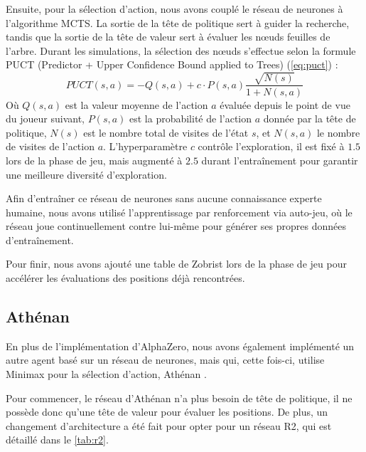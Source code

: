 \documentclass[a4paper,11pt]{article}
\begin{document}
Ensuite, pour la sélection d'action, nous avons couplé le réseau de neurones à l'algorithme MCTS. La sortie de la tête de politique sert à guider la recherche, tandis que la sortie de la tête de valeur sert à évaluer les n\oe uds feuilles de l'arbre. Durant les simulations, la sélection des n\oe uds s'effectue selon la formule PUCT (Predictor + Upper Confidence Bound applied to Trees) (\autoref{eq:puct}) :
\begin{equation}
	PUCT(s, a) = -Q(s, a) + c \cdot P(s, a) \frac{\sqrt{N(s)}}{1 + N(s, a)}
	\label{eq:puct}
\end{equation}
Où $Q(s, a)$ est la valeur moyenne de l'action $a$ évaluée depuis le point de vue du joueur suivant, $P(s, a)$ est la probabilité de l'action $a$ donnée par la tête de politique, $N(s)$ est le nombre total de visites de l'état $s$, et $N(s, a)$ le nombre de visites de l'action $a$. L'hyperparamètre $c$ contrôle l'exploration, il est fixé à $1.5$ lors de la phase de jeu, mais augmenté à $2.5$ durant l'entraînement pour garantir une meilleure diversité d'exploration.

Afin d'entraîner ce réseau de neurones sans aucune connaissance experte humaine, nous avons utilisé l'apprentissage par renforcement via auto-jeu, où le réseau joue continuellement contre lui-même pour générer ses propres données d'entraînement.

Pour finir, nous avons ajouté une table de Zobrist lors de la phase de jeu pour accélérer les évaluations des positions déjà rencontrées.

\subsection{Athénan}
En plus de l'implémentation d'AlphaZero, nous avons également implémenté un autre agent basé sur un réseau de neurones, mais qui, cette fois-ci, utilise Minimax pour la sélection d'action, Athénan \citep{cohensolal2025minimaxstrikes}.

Pour commencer, le réseau d'Athénan n'a plus besoin de tête de politique, il ne possède donc qu'une tête de valeur pour évaluer les positions. De plus, un changement d'architecture a été fait pour opter pour un réseau R2, qui est détaillé dans le \autoref{tab:r2}.
\end{document}
